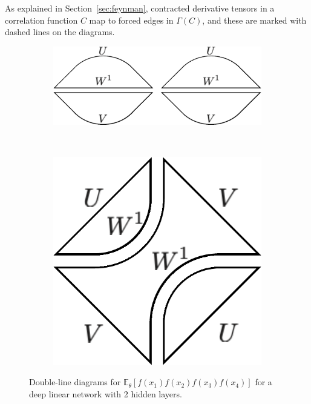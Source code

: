 \documentclass[english]{article}
\newcommand{\lexpp}[1]{\mathbb{E}_{#1}\left[}
\newcommand{\rexp}{\right]}
\begin{document}
As explained in Section~\ref{sec:feynman}, contracted derivative tensors in a correlation function $C$ map to forced edges in $\Gamma(C)$, and these are marked with dashed lines on the diagrams.
\begin{figure}[ht!]
    \centering
    \begin{subfigure}[b]{0.36\textwidth}
        \includegraphics[width=\textwidth]{new_figs/f_4_2hla}
        \caption{}
        \label{fig:dl_4_2hla_0}
    \end{subfigure}
\ \ \ \ \ \ \ \ \ \ \quad \quad \quad \quad 
    \begin{subfigure}[b]{0.18\textwidth}
        \includegraphics[width=\textwidth]{new_figs/f_4_2hlb}
        \caption{}
        \label{fig:dl_4_2hlb_0}
    \end{subfigure}
    \caption{Double-line diagrams for $\lexpp{\theta} f(x_1) f(x_2) f(x_3) f(x_4) \rexp$ for a deep linear network with 2 hidden layers.} \label{fig:dl_2pt_4pt}
\end{figure}
\end{document}
